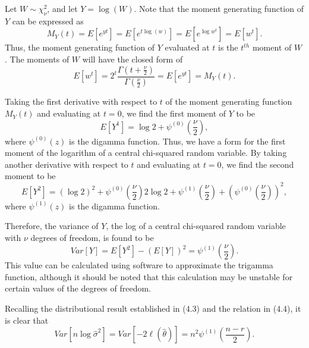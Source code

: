 \documentclass[submit]{smj}
\begin{document}
Let $W \sim \chi^2_{\nu}$, and let $Y = \log(W)$. Note that the moment generating function of $Y$ can be expressed as
\begin{equation*}
	M_Y (t) = E \left[ e^{yt} \right] = E \left[ e^{t\log(w)} \right] = E \left[ e^{\log w^t} \right] = E \left[ w^t \right] .
\end{equation*}
Thus, the moment generating function of $Y$ evaluated at $t$ is the $t^{th}$ moment of $W$. The moments of $W$ will have the
closed form of
\begin{equation*}
	E \left[ w^t \right] = 2^t \frac{\Gamma (t + \frac{\nu}{2})}{\Gamma (\frac{\nu}{2})} = E \left[ e^{yt} \right] = M_Y (t) .
\end{equation*}

Taking the first derivative with respect to $t$ of the moment generating function $M_Y (t)$ and evaluating at $t=0$, we find the first moment of $Y$ to be
\begin{equation*}
	E \left[ Y^1 \right] =  \log 2 + \psi^{(0)} \left( \frac{\nu}{2} \right) ,
\end{equation*}
where $\psi^{(0)}(z)$ is the digamma function. Thus, we have a form for the first moment of the logarithm of a central chi-squared random variable. By taking another
derivative with respect to $t$ and evaluating at $t=0$, we find the second moment to be
\begin{equation*}
	E \left[ Y^2 \right] =
	(\log 2)^2 + \psi^{(0)} \left( \frac{\nu}{2} \right) 2 \log 2  + \psi^{(1)} \left( \frac{\nu}{2} \right) + \left( \psi^{(0)} \left( \frac{\nu}{2} \right) \right)^2 ,
\end{equation*}
where $\psi^{(1)}(z)$ is the digamma function.

Therefore, the variance of $Y$, the log of a central chi-squared random variable with
$\nu$ degrees of freedom, is found to be
\begin{equation*}
	Var \left[ Y \right] = E \left[ Y^2 \right] - \left( E \left[ Y \right] \right)^2 = \psi^{(1)} \left( \frac{\nu}{2} \right) .
\end{equation*}
This value can be calculated using software to approximate the trigamma function, although it should be noted that this calculation may be unstable for certain values of the degrees of freedom.

Recalling the distributional result established in (4.3) and the relation in (4.4), it is clear that
\begin{equation*}
	Var \left[ n \log \hat{\sigma}^2 \right] = Var \left[ -2 \ell (\hat{\theta} ) \right] = n^2 \psi^{(1)} \left( \frac{n-r}{2} \right).
\end{equation*}
\end{document}
